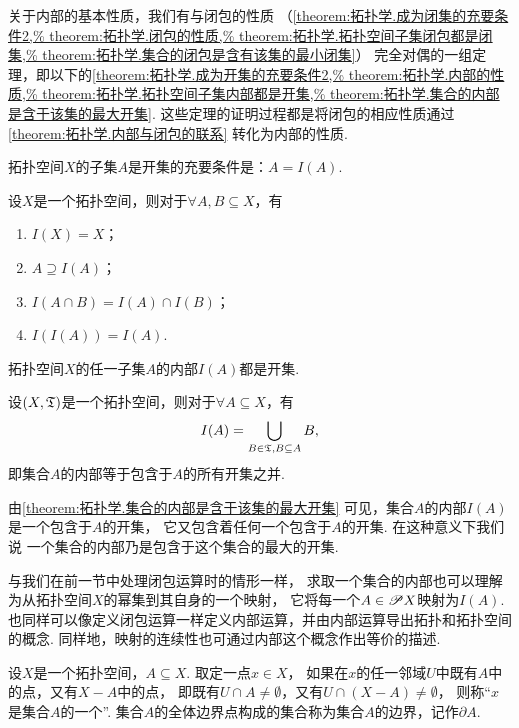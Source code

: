 关于内部的基本性质，我们有与闭包的性质
（\cref{theorem:拓扑学.成为闭集的充要条件2,%
theorem:拓扑学.闭包的性质,%
theorem:拓扑学.拓扑空间子集闭包都是闭集,%
theorem:拓扑学.集合的闭包是含有该集的最小闭集}）
完全对偶的一组定理，即以下的\cref{theorem:拓扑学.成为开集的充要条件2,%
theorem:拓扑学.内部的性质,%
theorem:拓扑学.拓扑空间子集内部都是开集,%
theorem:拓扑学.集合的内部是含于该集的最大开集}.
这些定理的证明过程都是将闭包的相应性质通过\cref{theorem:拓扑学.内部与闭包的联系}
转化为内部的性质.

\begin{theorem}\label{theorem:拓扑学.成为开集的充要条件2}
拓扑空间\(X\)的子集\(A\)是开集的充要条件是：\(A = I(A)\).
\end{theorem}

\begin{theorem}\label{theorem:拓扑学.内部的性质}
设\(X\)是一个拓扑空间，则对于\(\forall A,B \subseteq X\)，有
\begin{enumerate}
	\item \(I(X) = X\)；
	\item \(A \supseteq I(A)\)；
	\item \(I(A \cap B) = I(A) \cap I(B)\)；
	\item \(I(I(A)) = I(A)\).
\end{enumerate}
\end{theorem}

\begin{theorem}\label{theorem:拓扑学.拓扑空间子集内部都是开集}
拓扑空间\(X\)的任一子集\(A\)的内部\(I(A)\)都是开集.
\end{theorem}

\begin{theorem}\label{theorem:拓扑学.集合的内部是含于该集的最大开集}
设\((X,\mathfrak T)\)是一个拓扑空间，则对于\(\forall A \subseteq X\)，有\[
I(A) = \bigcup\limits_{B \in \mathfrak T, B \subseteq A} B,
\]
即集合\(A\)的内部等于包含于\(A\)的所有开集之并.
\end{theorem}

由\cref{theorem:拓扑学.集合的内部是含于该集的最大开集}
可见，集合\(A\)的内部\(I(A)\)是一个包含于\(A\)的开集，
它又包含着任何一个包含于\(A\)的开集.
在这种意义下我们说
一个集合的内部乃是包含于这个集合的最大的开集.

与我们在前一节中处理闭包运算时的情形一样，
求取一个集合的内部也可以理解为从拓扑空间\(X\)的幂集到其自身的一个映射，
它将每一个\(A \in \mathscr{P} X\)映射为\(I(A)\).
也同样可以像定义闭包运算一样定义内部运算，并由内部运算导出拓扑和拓扑空间的概念.
同样地，映射的连续性也可通过内部这个概念作出等价的描述.

\begin{definition}\label{definition:拓扑学.边界的概念}
设\(X\)是一个拓扑空间，\(A \subseteq X\).
取定一点\(x \in X\)，
如果在\(x\)的任一邻域\(U\)中既有\(A\)中的点，又有\(X - A\)中的点，
即既有\(U \cap A \neq \emptyset\)，又有\(U \cap (X-A) \neq \emptyset\)，
则称“\(x\)是集合\(A\)的一个”.
集合\(A\)的全体边界点构成的集合称为集合\(A\)的边界，记作\(\partial A\).
\end{definition}

\endgroup
